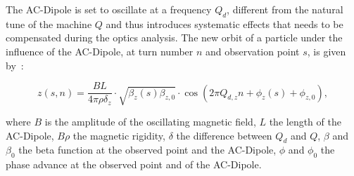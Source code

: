 The AC-Dipole is set to oscillate at a frequency $Q_d$, different from the natural tune of the
machine $Q$ and thus introduces systematic effects that needs to be compensated during the optics
analysis. The new orbit of a particle under the influence of the AC-Dipole, at turn number $n$ and
observation point $s$, is given by~\cite{serrano_lhc_2010}:

\begin{equation}
z(s, n) = \frac{BL}{4\pi\rho\delta_z} \cdot \sqrt{\beta_z(s) \beta_{z,0}} \cdot \cos \left( 2 \pi Q_{d,z}n + \phi_z(s) + \phi_{z,0}\right),
\label{eq:ac_dipole}
\end{equation}

where $B$ is the amplitude of the oscillating magnetic field, $L$ the length of the AC-Dipole,
$B\rho$ the magnetic rigidity, $\delta$ the difference between $Q_d$ and $Q$, $\beta$ and $\beta_0$
the beta function at the observed point and the AC-Dipole, $\phi$ and $\phi_0$ the phase advance at
the observed point and of the AC-Dipole.